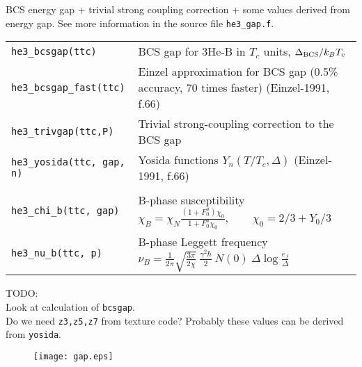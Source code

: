 \documentclass[a4paper]{article}
\begin{document}
BCS energy gap + trivial strong coupling correction + some values
derived from energy gap. See more information in the
source file {\tt he3\_gap.f}.

\medskip
\begin{tabular}{lp{9cm}}
\tt he3\_bcsgap(ttc)       & BCS gap for 3He-B in $T_c$ units, $\Delta_{\rm BCS}/ k_B T_c$\\
\tt he3\_bcsgap\_fast(ttc) & Einzel approximation for BCS gap (0.5\% accuracy, 70 times faster)\newline
                             {\small(Einzel-1991, f.66)}\\
\tt he3\_trivgap(ttc,P) & Trivial strong-coupling correction to the BCS gap\\
\tt he3\_yosida(ttc, gap, n) & Yosida functions $Y_n(T/T_c,\Delta)$\newline
{\small(Einzel-1991, f.66)}\\\\

\tt he3\_chi\_b(ttc, gap)    &B-phase susceptibility\newline
                             $\displaystyle \chi_B = \chi_N \frac{(1+F_0^a)\chi_0}{1+F_0^a\chi_0},
                             \qquad \chi_0 = 2/3 + Y_0/3$\\
\tt he3\_nu\_b(ttc, p)       &B-phase Leggett frequency\newline
                             $\displaystyle \nu_B =\frac{1}{2\pi}\sqrt{\frac{3\pi}{2\chi}}
                             \ \frac{\gamma^2\hbar}{2}\ N(0)\ \Delta \log\frac{e_f}{\Delta}  $\\


\end{tabular}
\medskip

\noindent TODO:\\
Look at calculation of {\tt bcsgap}.\\
Do we need {\tt z3,z5,z7} from texture code? Probably
these values can be derived from {\tt yosida}.\\

\begin{figure}[h]
\texttt{[image: gap.eps]}
\end{figure}
\eject
\end{document}
